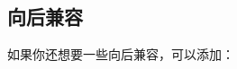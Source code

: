 \begin{typing}

\pdfhorigin             1in
\pdfvorigin             1in
\pdflinkmargin          0pt
\pdfdestmargin          0pt
\pdfthreadmargin        0pt
\pdfxformmargin         0pt
\end{typing}

\subsection{向后兼容}

如果你还想要一些向后兼容，可以添加：

\begin{typing}
\let\pdfpagewidth      \pagewidth
\let\pdfpageheight     \pageheight

\let\pdfadjustspacing  \adjustspacing
\let\pdfprotrudechars  \protrudechars
\let\pdfnoligatures    \ignoreligaturesinfont
\let\pdffontexpand     \expandglyphsinfont
\let\pdfcopyfont       \copyfont

\let\pdfxform          \saveboxresource
\let\pdflastxform      \lastsavedboxresourceindex
\let\pdfrefxform       \useboxresource

\let\pdfximage         \saveimageresource
\let\pdflastximage     \lastsavedimageresourceindex
\let\pdflastximagepages\lastsavedimageresourcepages
\let\pdfrefximage      \useimageresource

\let\pdfsavepos        \savepos
\let\pdflastxpos       \lastxpos
\let\pdflastypos       \lastypos

\let\pdfoutput         \outputmode
\let\pdfdraftmode      \draftmode

\let\pdfpxdimen        \pxdimen

\let\pdfinsertht       \insertht

\let\pdfnormaldeviate  \normaldeviate
\let\pdfuniformdeviate \uniformdeviate
\let\pdfsetrandomseed  \setrandomseed
\let\pdfrandomseed     \randomseed

\let\pdfprimitive      \primitive
\let\ifpdfprimitive    \ifprimitive

\let\ifpdfabsnum       \ifabsnum
\let\ifpdfabsdim       \ifabsdim
\end{typing}

